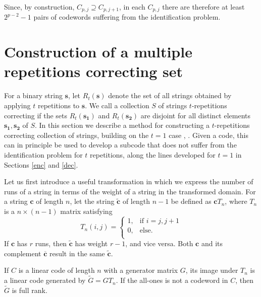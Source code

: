 Since, by construction, $C_{p,j} \supseteq C_{p,j+1}$, in each
$C_{p,j}$ there are therefore at least $2^{p-2}-1$ pairs of
codewords suffering from the identification problem.

\section{Construction of a multiple
repetitions correcting set}\label{sec3}

For a binary string $\mathbf{s}$, let $R_t({\mathbf{s}})$ denote
the set of all strings obtained by applying $t$ repetitions to
$\mathbf{s}$. We call a collection $S$ of strings $t$-repetitions
correcting if the sets $R_t(\mathbf{s_1})$ and $R_t(\mathbf{s_2})$
are disjoint for all distinct elements $\mathbf{s_1},
\mathbf{s_2}$ of $S$. In this section we describe a method for
constructing a $t$-repetitions correcting collection of strings,
building on the $t=1$ case \cite{lev:66}, \cite{sloane:00}. Given
a code, this can in principle be used to develop a subcode that
does not suffer from the identification problem for $t$
repetitions, along the lines developed for $t=1$ in Sections
\ref{enc} and \ref{dec}.

Let us first introduce a useful transformation in which we express
the number of runs of a string in terms of the weight of a string
in the transformed domain. For a string $\mathbf{c}$ of length
$n$, let the string $\tilde{\mathbf{c}}$ of length $n-1$ be
defined as $\mathbf{c}T_n$, where $T_n$ is a $n \times (n-1)$
matrix
satisfying\vspace{-0.0in}\begin{equation}\label{eq:t}T_{n}(i,j)=\left\{
\begin{array}{lll}
    1, & \text{if }i = j,j+1\\
    0, & \text{else.} \\
\end{array} \right. \end{equation}
If $\mathbf{c}$ has $r$ runs, then $\mathbf{\tilde{c}}$ has weight
$r-1$, and vice versa. Both $\mathbf{c}$ and its complement
$\mathbf{\overline{c}}$ result in the same $\mathbf{\tilde{c}}$.

If $C$ is a linear code of length $n$ with a generator matrix $G$,
its image under $T_n$ is a linear code generated by
$\tilde{G}=GT_n$. If the all-ones is not a codeword in $C$, then
$\tilde{G}$ is full rank.


